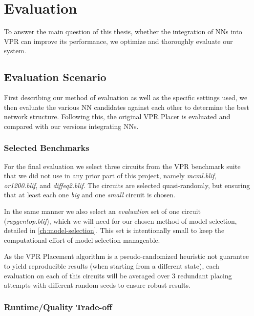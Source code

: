 
\chapter{Evaluation}\label{ch:evaluation}
\glsresetall %

To answer the main question of this thesis, whether the integration of \glspl{NN} into \gls{VPR} can improve its performance, we optimize and thoroughly evaluate our system.

\section{Evaluation Scenario}

First describing our method of evaluation as well as the specific settings used, we then evaluate the various \gls{NN} candidates against each other to determine the best network structure. Following this, the original \gls{VPR} Placer is evaluated and compared with our versions integrating \glspl{NN}.

\subsection{Selected Benchmarks}\label{ch:benchmarks}

For the final evaluation we select three circuits from the \gls{VPR} benchmark suite that we did not use in any prior part of this project, namely \textit{mcml.blif}, \textit{or1200.blif}, and \textit{diffeq2.blif}. The circuits are selected quasi-randomly, but ensuring that at least each one \textit{big} and one \textit{small} circuit is chosen.

In the same manner we also select an \textit{evaluation} set of one circuit (\textit{raygentop.blif}), which we will need for our chosen method of model selection, detailed in \ref{ch:model-selection}. This set is intentionally small to keep the computational effort of model selection manageable.

As the \gls{VPR} Placement algorithm is a pseudo-randomized heuristic not guarantee to yield reproducible results (when starting from a different state), each evaluation on each of this circuits will be averaged over 3 redundant placing attempts with different random seeds to ensure robust results.

\subsection{Runtime/Quality Trade-off}

